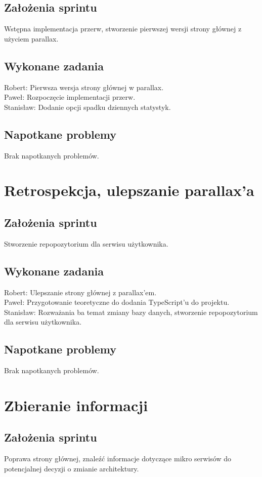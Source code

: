 \documentclass[a4paper,11pt]{report}
\begin{document}
\subsection {Założenia sprintu}
Wstępna implementacja przerw, stworzenie pierwszej wersji strony głównej z użyciem parallax.
\subsection {Wykonane zadania}
Robert: Pierwsza wersja strony głównej w parallax.\\
Paweł: Rozpoczęcie implementacji przerw.\\
Stanisław: Dodanie opcji spadku dziennych statystyk.\\
\subsection {Napotkane problemy}
Brak napotkanych problemów.

\section {Retrospekcja, ulepszanie parallax'a}
\subsection {Założenia sprintu}
Stworzenie repopozytorium dla serwisu użytkownika.
\subsection {Wykonane zadania}
Robert: Ulepszanie strony głównej z parallax'em.\\
Paweł: Przygotowanie teoretyczne do dodania TypeScript'u do projektu.\\
Stanisław: Rozważania ba temat zmiany bazy danych, stworzenie repopozytorium dla serwisu użytkownika.\\
\subsection {Napotkane problemy}
Brak napotkanych problemów.

\section {Zbieranie informacji}
\subsection {Założenia sprintu}
Poprawa strony głównej, znaleźć informacje dotyczące mikro serwisów do potencjalnej decyzji o zmianie architektury.
\end{document}
